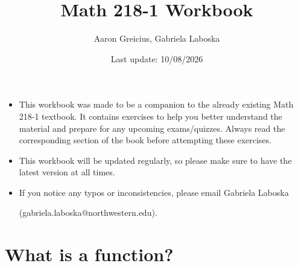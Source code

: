 \documentclass[12pt]{article}
\title{Math 218-1 Workbook}
\author{Aaron Greicius, Gabriela Laboska}
\date{Last update: 10/08/2026}
\begin{document}
	
	\maketitle
	\vspace{2cm}
	\begin{itemize}
		\item This workbook was made to be a companion to the already existing Math 218-1 textbook. It contains exercises to help you better understand the material and prepare for any upcoming exams/quizzes. Always read the corresponding section of the book before attempting these exercises.
		\item This workbook will be updated regularly, so please make sure to have the latest version at all times.
		\item If you notice any typos or inconsistencies, please email Gabriela Laboska 
		
		(gabriela.laboska@northwestern.edu).
	\end{itemize}
	
	\newpage
	
	\tableofcontents
	\newpage
	
	\section{What is a function?}
	
\end{document}
